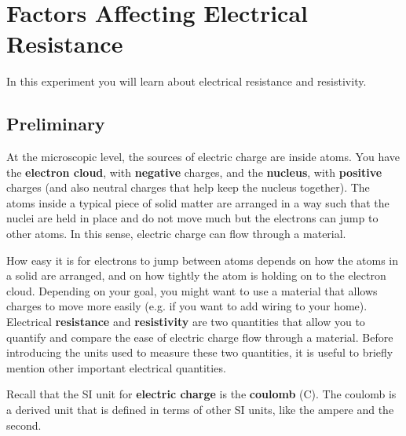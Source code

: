 \setcounter{chapter}{1}
\chapter{Factors Affecting Electrical Resistance}
%
In this experiment you will learn about electrical resistance and resistivity.
%
\section{Preliminary}
%
At the microscopic level, the sources of electric charge are inside atoms. You have the \textbf{electron cloud}, with \textbf{negative} charges, and the \textbf{nucleus}, with \textbf{positive} charges (and also neutral charges that help keep the nucleus together). The atoms inside a typical piece of solid matter are arranged in a way such that the nuclei are held in place and do not move much but the electrons can jump to other atoms. In this sense, electric charge can flow through a material.

How easy it is for electrons to jump between atoms depends on how the atoms in a solid are arranged, and on how tightly the atom is holding on to the electron cloud. Depending on your goal, you might want to use a material that allows charges to move more easily (e.g. if you want to add wiring to your home). Electrical \textbf{resistance} and \textbf{resistivity} are two quantities that allow you to quantify and compare the ease of electric charge flow through a material. Before introducing the units used to measure these two quantities, it is useful to briefly mention other important electrical quantities.

Recall that the SI unit for \textbf{electric charge} is the \textbf{coulomb} (C). The coulomb is a derived unit that is defined in terms of other SI units, like the ampere and the second.
%
